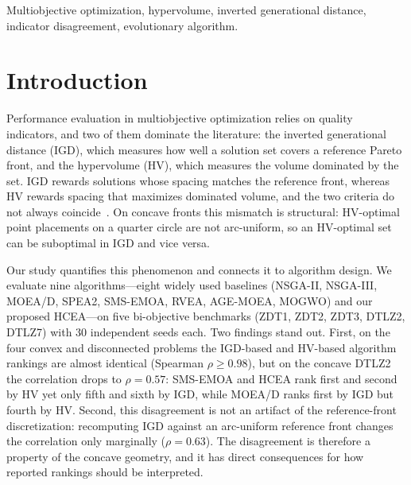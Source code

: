 \documentclass[journal]{IEEEtran}
\begin{document}
\begin{IEEEkeywords}%
Multiobjective optimization, hypervolume, inverted generational distance, indicator disagreement, evolutionary algorithm.%
\end{IEEEkeywords}%

\section{Introduction}
\IEEEPARstart{}{} %

Performance evaluation in multiobjective optimization relies on quality indicators, and two of them dominate the literature: the inverted generational distance (IGD), which measures how well a solution set covers a reference Pareto front, and the hypervolume (HV), which measures the volume dominated by the set. IGD rewards solutions whose spacing matches the reference front, whereas HV rewards spacing that maximizes dominated volume, and the two criteria do not always coincide~\cite{zitzler2003performance}. On concave fronts this mismatch is structural: HV-optimal point placements on a quarter circle are not arc-uniform, so an HV-optimal set can be suboptimal in IGD and vice versa.

Our study quantifies this phenomenon and connects it to algorithm design. We evaluate nine algorithms---eight widely used baselines (NSGA-II, NSGA-III, MOEA/D, SPEA2, SMS-EMOA, RVEA, AGE-MOEA, MOGWO) and our proposed HCEA---on five bi-objective benchmarks (ZDT1, ZDT2, ZDT3, DTLZ2, DTLZ7) with 30 independent seeds each. Two findings stand out. First, on the four convex and disconnected problems the IGD-based and HV-based algorithm rankings are almost identical (Spearman $\rho \geq 0.98$), but on the concave DTLZ2 the correlation drops to $\rho = 0.57$: SMS-EMOA and HCEA rank first and second by HV yet only fifth and sixth by IGD, while MOEA/D ranks first by IGD but fourth by HV. Second, this disagreement is not an artifact of the reference-front discretization: recomputing IGD against an arc-uniform reference front changes the correlation only marginally ($\rho = 0.63$). The disagreement is therefore a property of the concave geometry, and it has direct consequences for how reported rankings should be interpreted.
\end{document}
